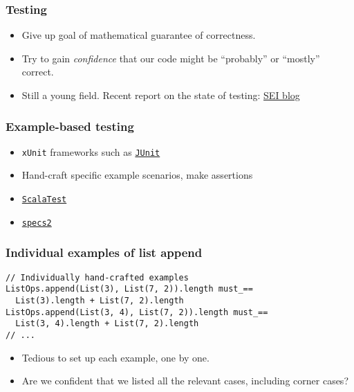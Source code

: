 \begin{frame}
  \frametitle{Testing}


  \begin{itemize}
    \item<2-> Give up goal of mathematical guarantee of correctness.
    \item<3-> Try to gain \emph{confidence} that our code might be ``probably'' or ``mostly'' correct.
    \item<4-> Still a young field. Recent report on the state of testing: \href{http://blog.sei.cmu.edu/post.cfm/common-testing-problems-pitfalls-to-prevent-and-mitigate}{SEI blog}
  \end{itemize}

\end{frame}

\begin{frame}
  \frametitle{Example-based testing}

  \begin{itemize}
    \item \texttt{xUnit} frameworks such as \href{http://junit.org/}{\texttt{JUnit}}
    \item Hand-craft specific example scenarios, make assertions
  \end{itemize}


  \begin{itemize}
    \item<2-> \href{http://scalatest.org/}{\texttt{ScalaTest}}
    \item<3-> \href{http://etorreborre.github.io/specs2/}{\texttt{specs2}}
  \end{itemize}

\end{frame}

\begin{frame}[fragile]
  \frametitle{Individual examples of list append}

  \begin{verbatim}
// Individually hand-crafted examples
ListOps.append(List(3), List(7, 2)).length must_==
  List(3).length + List(7, 2).length
ListOps.append(List(3, 4), List(7, 2)).length must_==
  List(3, 4).length + List(7, 2).length
// ...
  \end{verbatim}

  \begin{itemize}
    \item Tedious to set up each example, one by one.
    \item Are we confident that we listed all the relevant cases, including corner cases?
  \end{itemize}
\end{frame}

